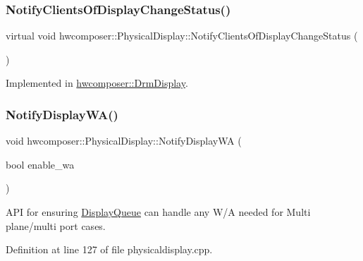 \mbox{\label{classhwcomposer_1_1PhysicalDisplay_aefba7f9543d7ef74d42f9e06dd0f1a58}} 
\subsubsection{\texorpdfstring{Notify\+Clients\+Of\+Display\+Change\+Status()}{NotifyClientsOfDisplayChangeStatus()}}
{\footnotesize\ttfamily virtual void hwcomposer\+::\+Physical\+Display\+::\+Notify\+Clients\+Of\+Display\+Change\+Status (\begin{DoxyParamCaption}{ }\end{DoxyParamCaption})\hspace{0.3cm}{\ttfamily [pure virtual]}}



Implemented in \mbox{\hyperlink{classhwcomposer_1_1DrmDisplay_af4cf9ce1ea43e3520506dfc75c751c1f}{hwcomposer\+::\+Drm\+Display}}.

\mbox{\label{classhwcomposer_1_1PhysicalDisplay_ac1fb0f67cead30c43f410e7216f08f9e}} 
\subsubsection{\texorpdfstring{Notify\+Display\+W\+A()}{NotifyDisplayWA()}}
{\footnotesize\ttfamily void hwcomposer\+::\+Physical\+Display\+::\+Notify\+Display\+WA (\begin{DoxyParamCaption}\item[{bool}]{enable\+\_\+wa }\end{DoxyParamCaption})}

A\+PI for ensuring \mbox{\hyperlink{classhwcomposer_1_1DisplayQueue}{Display\+Queue}} can handle any W/A needed for Multi plane/multi port cases. 

Definition at line 127 of file physicaldisplay.\+cpp.


